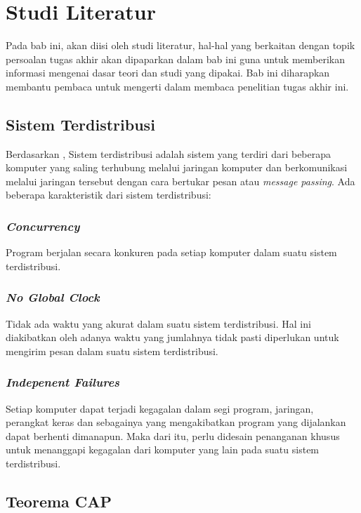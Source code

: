 \chapter{Studi Literatur}

Pada bab ini, akan diisi oleh studi literatur, hal-hal yang berkaitan dengan topik persoalan tugas akhir akan dipaparkan dalam bab ini guna untuk memberikan informasi mengenai dasar teori dan studi yang dipakai. Bab ini diharapkan membantu pembaca untuk mengerti dalam membaca penelitian tugas akhir ini.

\section{Sistem Terdistribusi}
\label{sec:sister}

Berdasarkan \parencite{distributedsystem}, Sistem terdistribusi adalah sistem yang terdiri dari beberapa komputer yang saling terhubung melalui jaringan komputer dan berkomunikasi melalui jaringan tersebut dengan cara bertukar pesan atau \emph{message passing}. Ada beberapa karakteristik dari sistem terdistribusi:

\subsection{\emph{Concurrency}}
Program berjalan secara konkuren pada setiap komputer dalam suatu sistem terdistribusi.

\subsection{\emph{No Global Clock}}
Tidak ada waktu yang akurat dalam suatu sistem terdistribusi. Hal ini diakibatkan oleh adanya waktu yang jumlahnya tidak pasti diperlukan untuk mengirim pesan dalam suatu sistem terdistribusi.

\subsection{\emph{Indepenent Failures}}
Setiap komputer dapat terjadi kegagalan dalam segi program, jaringan, perangkat keras dan sebagainya yang mengakibatkan program yang dijalankan dapat berhenti dimanapun. Maka dari itu, perlu didesain penanganan khusus untuk menanggapi kegagalan dari komputer yang lain pada suatu sistem terdistribusi.

\section{Teorema CAP}

